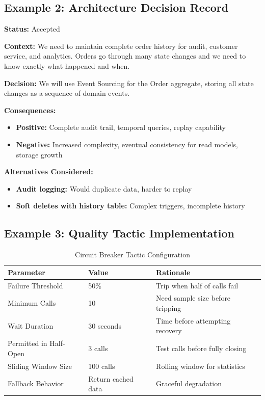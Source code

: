 \documentclass[11pt,letterpaper]{article}
\begin{document}
\subsection{Example 2: Architecture Decision Record}

\begin{examplebox}
\textbf{Status:} Accepted

\textbf{Context:} We need to maintain complete order history for audit, customer service, and analytics. Orders go through many state changes and we need to know exactly what happened and when.

\textbf{Decision:} We will use Event Sourcing for the Order aggregate, storing all state changes as a sequence of domain events.

\textbf{Consequences:}
\begin{itemize}[nosep]
    \item \textbf{Positive:} Complete audit trail, temporal queries, replay capability
    \item \textbf{Negative:} Increased complexity, eventual consistency for read models, storage growth
\end{itemize}

\textbf{Alternatives Considered:}
\begin{itemize}[nosep]
    \item \textbf{Audit logging:} Would duplicate data, harder to replay
    \item \textbf{Soft deletes with history table:} Complex triggers, incomplete history
\end{itemize}
\end{examplebox}

\subsection{Example 3: Quality Tactic Implementation}

\begin{table}[H]
\centering
\caption{Circuit Breaker Tactic Configuration}
\small
\begin{tabular}{@{}L{3.5cm}L{3cm}L{5.5cm}@{}}
\toprule
\textbf{Parameter} & \textbf{Value} & \textbf{Rationale} \\
\midrule
Failure Threshold & 50\% & Trip when half of calls fail \\
\addlinespace
Minimum Calls & 10 & Need sample size before tripping \\
\addlinespace
Wait Duration & 30 seconds & Time before attempting recovery \\
\addlinespace
Permitted in Half-Open & 3 calls & Test calls before fully closing \\
\addlinespace
Sliding Window Size & 100 calls & Rolling window for statistics \\
\addlinespace
Fallback Behavior & Return cached data & Graceful degradation \\
\bottomrule
\end{tabular}
\end{table}
\end{document}

